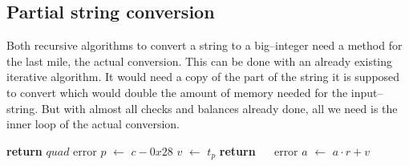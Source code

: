 \documentclass[a4paper,10pt]{article}
\newcommand*\Let[2]{\State #1 $\gets$ #2}
\newcommand{\RETURN}{\State \textbf{return} }
\theoremstyle{plain} %
\theoremstyle{definition}
\theoremstyle{remark}
\begin{document}
\subsection{Partial string conversion}
Both recursive algorithms to convert a string to a big--integer need a method for the last mile, the actual conversion. This can be done with an already existing iterative algorithm. It would need a copy of the part of the string it is supposed to convert which would double the amount of memory needed for the input--string.
But with almost all checks and balances already done, all we need is the inner loop of the actual conversion.

\begin{center}
\begin{minipage}{.9\linewidth}
  \begin{algorithmic}[1]
          \RETURN {$quad$ error}
       \EndIf
       \Let{$p$}{$c - 0x28$}
       \State {}
       \Let{$v$}{$t_p$}
        
          \RETURN {$\quad$ error}
       \EndIf
       \Let{$a$}{$a \cdot r + v$}
    \EndFor
    \EndFunction
  \end{algorithmic}
\end{minipage}
\end{center}
\end{document}

